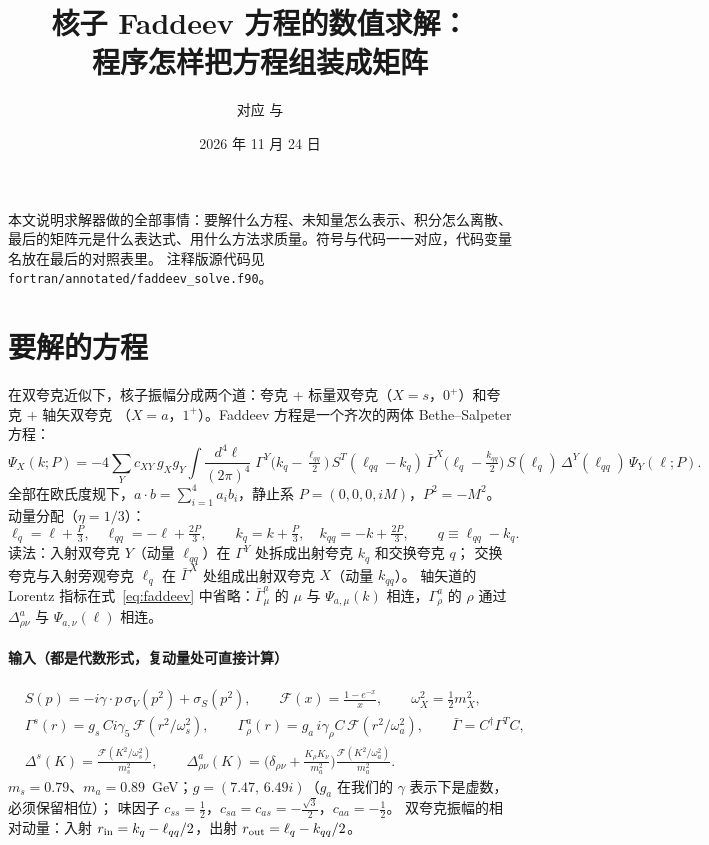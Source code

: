 \documentclass[11pt,a4paper]{ctexart}
\title{核子 Faddeev 方程的数值求解：\\程序怎样把方程组装成矩阵}
\author{对应 \code{fortran/sources/zero\_faddeev/faddeev\_solve.f90} 与 \code{qdq/faddeev.py}}
\date{2026 年 11 月 24 日}
\newcommand{\lQ}{\ell_q}
\newcommand{\lQQ}{\ell_{qq}}
\newcommand{\kQ}{k_q}
\newcommand{\kQQ}{k_{qq}}
\newcommand{\code}[1]{\texttt{#1}}
\newcommand{\Gb}{\bar\Gamma}
\begin{document}
\maketitle

\noindent 本文说明求解器做的全部事情：要解什么方程、未知量怎么表示、积分怎么离散、
最后的矩阵元是什么表达式、用什么方法求质量。符号与代码一一对应，代码变量名放在最后的对照表里。
注释版源代码见 \code{fortran/annotated/faddeev\_solve.f90}。

\section{要解的方程}

在双夸克近似下，核子振幅分成两个道：夸克 + 标量双夸克（$X=s$，$0^+$）和夸克 + 轴矢双夸克
（$X=a$，$1^+$）。Faddeev 方程是一个齐次的两体 Bethe--Salpeter 方程：
\begin{equation}\label{eq:faddeev}
\Psi_X(k;P) = -4\sum_{Y} c_{XY}\, g_X g_Y \int\!\frac{d^4\ell}{(2\pi)^4}\;
\Gamma^{Y}\!\big(\kQ-\tfrac{\lQQ}{2}\big)\, S^{T}(\lQQ-\kQ)\,
\Gb^{X}\!\big(\lQ-\tfrac{\kQQ}{2}\big)\, S(\lQ)\, \Delta^{Y}(\lQQ)\, \Psi_Y(\ell;P).
\end{equation}
全部在欧氏度规下，$a\cdot b=\sum_{i=1}^4 a_ib_i$，静止系 $P=(0,0,0,iM)$，$P^2=-M^2$。
动量分配（$\eta=1/3$）：
\[
\lQ=\ell+\tfrac{P}{3},\quad \lQQ=-\ell+\tfrac{2P}{3},\qquad
\kQ=k+\tfrac{P}{3},\quad \kQQ=-k+\tfrac{2P}{3},\qquad q\equiv\lQQ-\kQ .
\]
读法：入射双夸克 $Y$（动量 $\lQQ$）在 $\Gamma^Y$ 处拆成出射夸克 $\kQ$ 和交换夸克 $q$；
交换夸克与入射旁观夸克 $\lQ$ 在 $\Gb^X$ 处组成出射双夸克 $X$（动量 $\kQQ$）。
轴矢道的 Lorentz 指标在式~\eqref{eq:faddeev} 中省略：$\Gb^{a}_\mu$ 的 $\mu$ 与 $\Psi_{a,\mu}(k)$
相连，$\Gamma^{a}_\rho$ 的 $\rho$ 通过 $\Delta^a_{\rho\nu}$ 与 $\Psi_{a,\nu}(\ell)$ 相连。

\paragraph{输入（都是代数形式，复动量处可直接计算）}
\begin{align*}
&S(p) = -i\gamma\!\cdot\!p\,\sigma_V(p^2)+\sigma_S(p^2), \qquad
\mathcal F(x)=\frac{1-e^{-x}}{x},\qquad \omega_X^2=\tfrac12 m_X^2,\\
&\Gamma^{s}(r)=g_s\,C i\gamma_5\,\mathcal F(r^2/\omega_s^2),\qquad
\Gamma^{a}_\rho(r)=g_a\,i\gamma_\rho C\,\mathcal F(r^2/\omega_a^2),\qquad \Gb=C^\dagger\Gamma^TC,\\
&\Delta^{s}(K)=\frac{\mathcal F(K^2/\omega_s^2)}{m_s^2},\qquad
\Delta^{a}_{\rho\nu}(K)=\Big(\delta_{\rho\nu}+\frac{K_\rho K_\nu}{m_a^2}\Big)\frac{\mathcal F(K^2/\omega_a^2)}{m_a^2}.
\end{align*}
$m_s=0.79$、$m_a=0.89$~GeV；$g=(7.47,\,6.49i)$（$g_a$ 在我们的 $\gamma$ 表示下是虚数，必须保留相位）；
味因子 $c_{ss}=\tfrac12$，$c_{sa}=c_{as}=-\tfrac{\sqrt3}{2}$，$c_{aa}=-\tfrac12$。
双夸克振幅的相对动量：入射 $r_{\rm in}=\kQ-\lQQ/2$，出射 $r_{\rm out}=\lQ-\kQQ/2$。
\end{document}
